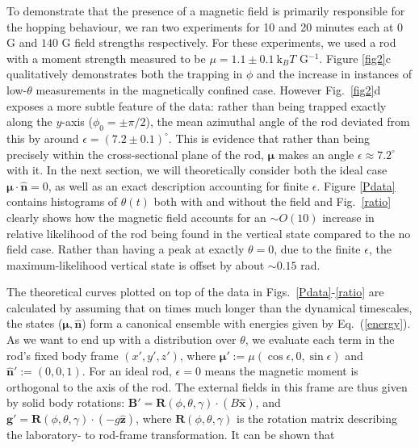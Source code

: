 \documentclass[aps,prl,twocolumn,superscriptaddress]{revtex4-1}
\newcommand{\vcrm}[1]{\mathbf{#1}}
\newcommand{\hvcrm}[1]{\mathbf{\hat{#1}}}
\newcommand{\vc}[1]{\boldsymbol{#1}}
\newcommand{\kk}{\mathrm{k}_B}
\begin{document}
To demonstrate that the presence of a magnetic field is primarily responsible for the hopping behaviour, we ran two experiments for 10 and 20 minutes each at $0$ G and $140$ G field strengths respectively. For these experiments, we used a rod with a moment strength measured to be $\mu = 1.1\pm0.1\ \kk T$ G$^{-1}$. Figure \ref{fig2}c qualitatively demonstrates both the trapping in $\phi$ and the increase in instances of low-$\theta$ measurements in the magnetically confined case. However Fig.\ \ref{fig2}d exposes a more subtle feature of the data: rather than being trapped exactly along the $y$-axis ($\phi_0=\pm\pi/2$), the mean azimuthal angle of the rod deviated from this by around $\epsilon = (7.2\pm 0.1)^\circ$. This is evidence that rather than being precisely within the cross-sectional plane of the rod, $\vc{\mu}$ makes an angle $\epsilon\approx 7.2^\circ$ with it. In the next section, we will theoretically consider both the ideal case $\vc{\mu}\cdot\hvcrm{n}=0$, as well as an exact description accounting for finite $\epsilon$. Figure \ref{Pdata} contains histograms of $\theta(t)$ both with and without the field and Fig.\ \ref{ratio} clearly shows how the magnetic field accounts for an $\sim O(10)$ increase in relative likelihood of the rod being found in the vertical state compared to the no field case. Rather than having a peak at exactly $\theta=0$, due to the finite $\epsilon$, the maximum-likelihood vertical state is offset by about $\sim 0.15$ rad. 

%
%
%
%
%
%
%

The theoretical curves plotted on top of the data in Figs.\ \ref{Pdata}-\ref{ratio} are calculated by assuming that on times much longer than the dynamical timescales, the states ($\vc{\mu},\hvcrm{n}$) form a canonical ensemble with energies given by Eq.\ (\ref{energy}). As we want to end up with a distribution over $\theta$, we evaluate each term in the rod's fixed body frame $(x',y',z')$, where $\vc{\mu}' :=\mu(\cos\epsilon,0,\sin\epsilon)$ and $\hvcrm{n}' :=(0,0,1)$. For an ideal rod, $\epsilon=0$ means the magnetic moment is orthogonal to the axis of the rod. The external fields in this frame are thus given by solid body rotations: $\vcrm{B}' = \vcrm{R}(\phi,\theta,\gamma)\cdot ( B \hvcrm{x})$, and $\vcrm{g}'= \vcrm{R}(\phi,\theta,\gamma)\cdot ( -g \hvcrm{z})$, where $\vcrm{R}(\phi,\theta,\gamma)$ is the rotation matrix describing the laboratory- to rod-frame transformation. It can be shown that
\end{document}
